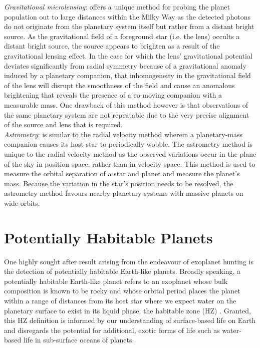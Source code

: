 \emph{Gravitational microlensing}:
offers a unique method for probing the planet population out to large distances
within the Milky Way as the detected photons do not originate from the planetary system itself
but rather from a distant bright source. As the gravitational field of a
foreground star (i.e. the lens) occults a distant bright source, the source appears to
brighten as a result of the gravitational lensing effect. In the case for which the lens' gravitational
potential deviates significantly from radial symmetry because of a gravitational anomaly induced by a
planetary companion, that inhomogeneity in the gravitational field of the lens will disrupt the smoothness
of the field and cause an anomalous brightening that reveals the presence of a co-moving companion with
a measurable mass. One drawback of this method however is that observations of the same planetary
system are not repeatable due to the very precise alignment of the source and lens that is required. \\

\emph{Astrometry}: is similar to the radial velocity method wherein a planetary-mass companion
causes its host star to periodically wobble. The astrometry method is unique to the radial velocity
method as the observed variations occur in the plane of the sky in position space, rather than in velocity
space. This method is used to measure the orbital separation of a
star and planet and measure the planet's mass. Because the variation in the star's position
needs to be resolved, the astrometry method favours nearby planetary systems with massive
planets on wide-orbits. \\



\iffalse
\section{Potentially Habitable Planets} \label{sect:HZ}
One highly sought after result arising from the endeavour of exoplanet hunting 
is the detection of potentially habitable Earth-like planets. 
Broadly speaking, a potentially habitable Earth-like planet refers to 
an exoplanet whose bulk composition is known to be rocky and whose 
orbital period places the planet within a range of distances from its host star 
where we expect water on the planetary surface to exist in its liquid phase; 
the habitable zone (HZ) \citep{dole64, hart79}. Granted, this HZ 
definition is 
informed by our understanding of surface-based life on Earth and disregards 
the potential for additional, exotic forms of life such as water-based life 
in sub-surface oceans of planets. \\

